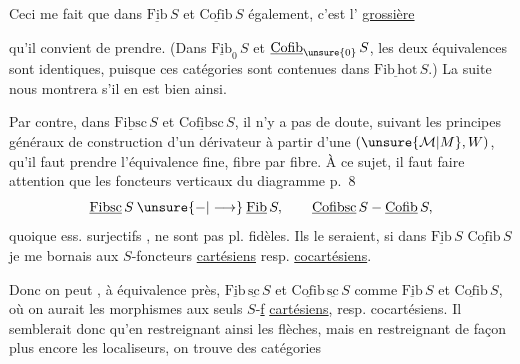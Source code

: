 Ceci me fait  que dans $\underline{\mathrm{Fib}}\,S$ et $\underline{\mathrm{Cofib}}\,S$ également, c'est l' \uline{grossière}


qu'il convient de prendre. (Dans $\underline{\mathrm{Fib}}_0\,S$ et $\underline{\mathrm{Cofib}}_{\unsure{0}}\,S$,  les deux équivalences sont identiques, puisque ces  catégories sont contenues dans $\underline{\mathrm{Fib\,hot}}\,S$.) La suite nous montrera s'il en est bien ainsi.

Par contre, dans $\underline{\mathrm{Fibsc}}\,S$ et $\underline{\mathrm{Cofibsc}}\,S$, il n'y a pas de doute, suivant les principes généraux de construction d'un dérivateur à partir d'une $(\unsure{\mathcal M|M},W)$, qu'il faut prendre l'équivalence fine, fibre par fibre. À ce sujet, il faut faire attention que les foncteurs verticaux du diagramme p.~8
\[
\underline{\mathrm{Fibsc}}\,S\mathbin{\unsure{-|\longrightarrow}}\underline{\mathrm{Fib}}\,S,\qquad
\underline{\mathrm{Cofibsc}}\,S\mathbin{-}\underline{\mathrm{Cofib}}\,S,
\]
quoique  ess. surjectifs , ne sont pas pl. fidèles. Ils le seraient,  si dans $\underline{\mathrm{Fib}}\,S$  $\underline{\mathrm{Cofib}}\,S$ je me bornais aux $S$-foncteurs \uline{cartésiens} resp. \uline{cocartésiens}.

Donc on peut , à équivalence près, $\underline{\mathrm{Fib}}\,\underline{\mathrm{sc}}\,S$ et $\underline{\mathrm{Cofib}}\,\underline{\mathrm{sc}}\,S$ comme $\underline{\mathrm{Fib}}\,S$ et $\underline{\mathrm{Cofib}}\,S$, où on aurait  les morphismes aux seuls $S$-\uline{f} \uline{cartésiens}, resp. cocartésiens. Il semblerait donc qu'en restreignant ainsi les flèches, mais en restreignant de façon plus  encore les localiseurs, on trouve des catégories  

